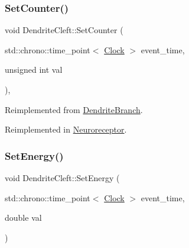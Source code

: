 \mbox{\label{classDendriteCleft_a428b8e5117f381a382e0071b936d42a1}} 
\subsubsection{\texorpdfstring{Set\+Counter()}{SetCounter()}}
{\footnotesize\ttfamily void Dendrite\+Cleft\+::\+Set\+Counter (\begin{DoxyParamCaption}\item[{std\+::chrono\+::time\+\_\+point$<$ \mbox{\hyperlink{universe_8h_a0ef8d951d1ca5ab3cfaf7ab4c7a6fd80}{Clock}} $>$}]{event\+\_\+time,  }\item[{unsigned int}]{val }\end{DoxyParamCaption})\hspace{0.3cm}{\ttfamily [inline]}, {\ttfamily [virtual]}}



Reimplemented from \mbox{\hyperlink{classDendriteBranch_a2ce03fbad4a70564eeaafb62debd4d74}{Dendrite\+Branch}}.



Reimplemented in \mbox{\hyperlink{classNeuroreceptor_a0660a316ef44cf723509f720acd16f24}{Neuroreceptor}}.

\mbox{\label{classDendriteCleft_a7e09ccb70936deabde9c12457cec949c}} 
\subsubsection{\texorpdfstring{Set\+Energy()}{SetEnergy()}}
{\footnotesize\ttfamily void Dendrite\+Cleft\+::\+Set\+Energy (\begin{DoxyParamCaption}\item[{std\+::chrono\+::time\+\_\+point$<$ \mbox{\hyperlink{universe_8h_a0ef8d951d1ca5ab3cfaf7ab4c7a6fd80}{Clock}} $>$}]{event\+\_\+time,  }\item[{double}]{val }\end{DoxyParamCaption})\hspace{0.3cm}{\ttfamily [inline]}}

\mbox{\label{classDendriteCleft_a3a75af4d6fd97c9635134509f170a04e}} 
